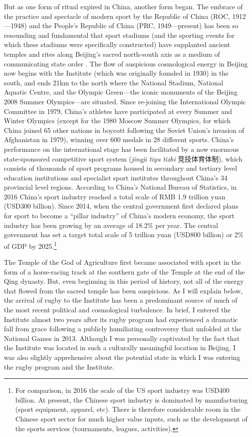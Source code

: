 \begin{CJK}{UTF8}{gbsn}
But as one form of ritual expired in China, another form began.
The embrace of the practice and spectacle of modern sport by the Republic of China (ROC, 1912---1948) and the People's Republic of China (PRC, 1949---present) has been so resounding and fundamental that sport stadiums (and the sporting events for which these stadiums were specifically constructed) have supplanted ancient temples and rites along Beijing's sacred north-south axis as a medium of communicating state order \citep{Brownell1995}.  The flow of auspicious cosmological energy in Beijing now begins with the Institute (which was originally founded in 1930) in the south, and ends 21km to the north where the National Stadium, National Aquatic Centre, and the Olympic Green---the iconic monuments of the Beijing 2008 Summer Olympics---are situated.  Since re-joining the International Olympic Committee in 1979, China's athletes have participated at every Summer and Winter Olympics (except for the 1980 Moscow Summer Olympics, for which China joined 65 other nations in boycott following the Soviet Union's invasion of Afghanistan in 1979), winning over 600 medals in 28 different sports.  China's performance on the international stage has been facilitated by a now enormous state-sponsored competitive sport system (\textit{jingji tiyu tizhi} 竞技体育体制), which consists of thousands of sport programs housed in secondary and tertiary level education institutions and specialist sport institutes throughout China's 34 provincial level regions.  According to China's National Bureau of Statistics, in 2016 China's sport industry reached a total scale of RMB 1.9 trillion yuan (USD300 billion).  Since 2014, when the central government first declared plans for sport to become a ``pillar industry'' of China's modern economy, the sport industry has been growing by an average of 18.2\% per year.  The central government has set a target total scale of 5 trillion yuan (USD800 billion) or 2\% of GDP by 2025.\footnote{For comparison, in 2016 the scale of the US sport industry was USD400 billion. At present, the Chinese sport industry is dominated by manufacturing (sport equipment, apparel, etc).  There is therefore considerable room in the Chinese sport sector for much higher value inputs, such as the development of the sports services (tournaments, leagues, activities).}

The Temple of the God of Agriculture first became associated with sport in the form of a horse-racing track at the southern gate of the Temple at the end of the Qing dynasty. But, even beginning in this period of history, not all of the energy that flowed from the sacred temple has been auspicious.  As I will explain below, the arrival of rugby to the Institute has been a predominant source of much of the most recent political and cosmological turbulence.  In brief, I entered the Institute almost two years after its rugby program had experienced a dramatic fall from grace following a publicly humiliating controversy that unfolded at the National Games in 2013.  Although I was personally captivated by the fact that the Institute was located in such a culturally meaningful location in Beijing, I was also slightly apprehensive about the potential state in which I was entering the rugby program and the Institute.


\end{CJK}
